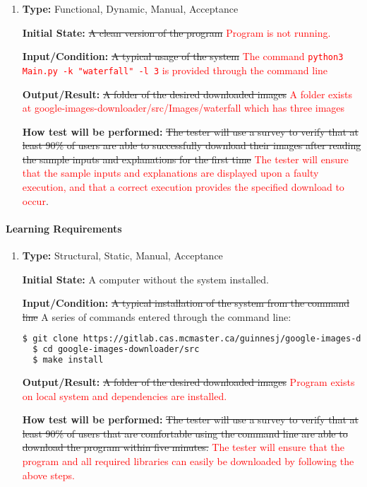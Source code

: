 \documentclass[12pt, titlepage]{article}
\begin{document}
\begin{enumerate}[label=NFR-EUR\arabic*:, wide=0pt, leftmargin=*]

\item \phantom{empty}

\textbf{Type:} Functional, Dynamic, Manual, Acceptance
					
\textbf{Initial State:} \sout{A clean version of the program} \textcolor{red}{Program is not running.}
					
\textbf{Input/Condition:} \sout{A typical usage of the system} 
\textcolor{red}{\textcolor{red}{The command \texttt{python3 Main.py -k "waterfall" -l 3} is provided through the command line}}
					
\textbf{Output/Result:} \sout{A folder of the desired downloaded images}
\textcolor{red}{A folder exists at google-images-downloader/src/Images/waterfall which has three images}
					
\textbf{How test will be performed:} \sout{The tester will use a survey to verify that at least 90\% of users are able to successfully download their images after reading the sample inputs and explanations for the first time} \textcolor{red}{The tester will ensure that the sample inputs and explanations are displayed upon a faulty execution, and that a correct execution provides the specified download to occur}.

\end{enumerate}

\paragraph{Learning Requirements}

\begin{enumerate}[label=NFR-LR\textcolor{red}{2}:, wide=0pt, leftmargin=*]

\item \phantom{empty}

\textbf{Type:} Structural, Static, Manual, Acceptance
					
\textbf{Initial State:} A computer without the system installed.
					
\textbf{Input/Condition:} \sout{A typical installation of the system from the command line}
\color{red}A series of commands entered through the command line:
\begin{lstlisting}[language=bash]
  $ git clone https://gitlab.cas.mcmaster.ca/guinnesj/google-images-downloader
  $ cd google-images-downloader/src
  $ make install
\end{lstlisting}
\color{black}
					
\textbf{Output/Result:} \sout{A folder of the desired downloaded images}
\textcolor{red}{Program exists on local system and dependencies are installed.}
					
\textbf{How test will be performed:} \sout{The tester will use a survey to verify that at least 90\% of users that are comfortable using the command line are able to download the program within five minutes.} \textcolor{red}{The tester will ensure that the program and all required libraries can easily be downloaded by following the above steps.}

\end{enumerate}
\end{document}
